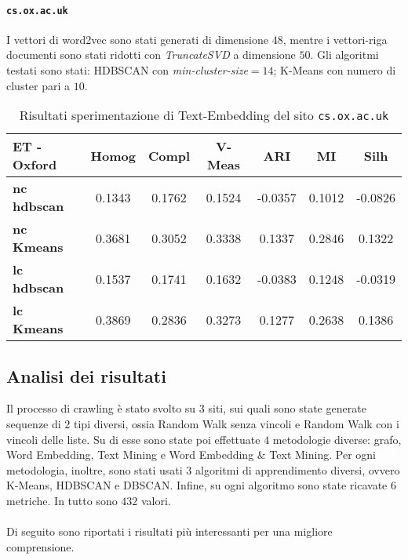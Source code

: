 \paragraph{\texttt{cs.ox.ac.uk}} I vettori di word2vec sono stati generati di dimensione $48$, mentre i vettori-riga documenti sono stati ridotti con \textit{TruncateSVD} a dimensione $50$. Gli algoritmi testati sono stati: HDBSCAN con \textit{min-cluster-size}$=14$; K-Means con numero di cluster pari a $10$. 


\begin{table}[H]
	\begin{tabular}{| l | c | c | c | c | c | c |}
	\hline
	\textbf{ET - Oxford}  & \textbf{Homog} & \textbf{Compl} & \textbf{V-Meas}  & \textbf{ARI}  & \textbf{MI}  & \textbf{Silh} \\ [3ex] 
	\hline
	\textbf{nc hdbscan} & 0.1343 & 0.1762 & 0.1524 & -0.0357 & 0.1012 & -0.0826 \\ [3ex]
	 \hline
	\textbf{nc Kmeans} & 0.3681 & 0.3052 & 0.3338 & 0.1337 & 0.2846 & 0.1322 \\ [3ex]
	 \hline	
	\textbf{lc hdbscan} & 0.1537 & 0.1741 & 0.1632 & -0.0383 & 0.1248 & -0.0319 \\ [3ex]
	\hline
	\textbf{lc Kmeans} & 0.3869 & 0.2836 & 0.3273 & 0.1277 & 0.2638 & 0.1386 \\ [3ex]
	\hline
	\end{tabular}
	\caption{Risultati sperimentazione di Text-Embedding del sito \texttt{cs.ox.ac.uk}}
	\label{metricheTextEmbedOx}
\end{table}

\subsection{Analisi dei risultati}
Il processo di crawling è stato svolto su $3$ siti, sui quali sono state generate sequenze di $2$ tipi diversi, ossia Random Walk senza vincoli e Random Walk con i vincoli delle liste. Su di esse sono state poi effettuate $4$ metodologie diverse: grafo, Word Embedding, Text Mining e Word Embedding \& Text Mining. Per ogni metodologia, inoltre, sono stati usati $3$ algoritmi di apprendimento diversi, ovvero K-Means, HDBSCAN e DBSCAN. Infine, su ogni algoritmo sono state ricavate $6$ metriche. In tutto sono $432$ valori. 
\\\\
Di seguito sono riportati i risultati più interessanti per una migliore comprensione.


